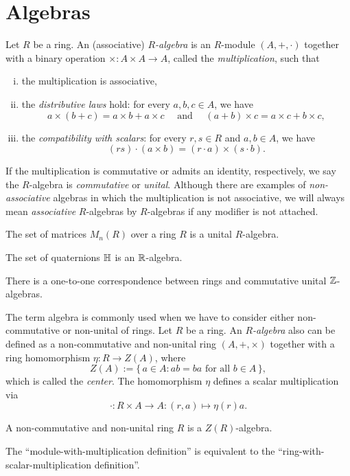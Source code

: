 \documentclass{../note}
\begin{document}
\section{Algebras}
\begin{prb}
Let $R$ be a ring.
An (associative) \emph{$R$-algebra} is an $R$-module $(A,+,\cdot)$ together with a binary operation $\times:A\times A\to A$, called the \emph{multiplication}, such that
\begin{enumerate}[(i)]
\item the multiplication is associative,
\item the \emph{distributive laws} hold: for every $a,b,c\in A$, we have
\[a\times(b+c)=a\times b+a\times c\quad\text{ and }\quad(a+b)\times c=a\times c+b\times c,\]
\item the \emph{compatibility with scalars}: for every $r,s\in R$ and $a,b\in A$, we have
\[(rs)\cdot(a\times b)=(r\cdot a)\times(s\cdot b).\]
\end{enumerate}
If the multiplication is commutative or admits an identity, respectively, we say the $R$-algebra is \emph{commutative} or \emph{unital}.
Although there are examples of \emph{non-associative} algebras in which the multiplication is not associative, we will always mean \emph{associative} $R$-algebras by $R$-algebras if any modifier is not attached.
\begin{parts}
\item The set of matrices $M_n(R)$ over a ring $R$ is a unital $R$-algebra.
\item The set of quaternions $\mathbb{H}$ is an $\mathbb{R}$-algebra.
\item There is a one-to-one correspondence between rings and commutative unital $\mathbb{Z}$-algebras.
\end{parts}
\end{prb}


\begin{prb}
The term algebra is commonly used when we have to consider either non-commutative or non-unital of rings.
Let $R$ be a ring.
An \emph{$R$-algebra} also can be defined as a non-commutative and non-unital ring $(A,+,\times)$ together with a ring homomorphism $\eta:R\to Z(A)$, where
\[Z(A):=\{\,a\in A:ab=ba\text{ for all }b\in A\,\},\]
which is called the \emph{center}.
The homomorphism $\eta$ defines a scalar multiplication via
\[\cdot:R\times A\to A:(r,a)\mapsto\eta(r)a.\]
\begin{parts}
\item A non-commutative and non-unital ring $R$ is a $Z(R)$-algebra.
\item The ``module-with-multiplication definition'' is equivalent to the ``ring-with-scalar-multiplication definition''.
\end{parts}
\end{prb}
\end{document}
